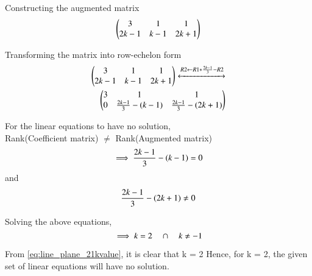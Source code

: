 Constructing the augmented matrix \\

$$
\begin{pmatrix}
    3 & 1 & 1 \\ 
    2\emph{k}-1 & \emph{k}-1 & 2\emph{k}+1
\end{pmatrix}
$$

Transforming the matrix into row-echelon form \\
\begin{align}
\begin{pmatrix}
3 & 1 & 1 \\
2\emph{k}-1 & \emph{k}-1 & 2\emph{k}+1
\end{pmatrix}
  \xleftrightarrow[]{R2 \leftarrow R1*\frac{2\emph{k}-1}{3} - R2 } \nonumber \\
\begin{pmatrix}
3 & 1 & 1 \\
0 & \frac{2\emph{k}-1}{3}-(\emph{k}-1) & \frac{2\emph{k}-1}{3}-(2\emph{k}+1)
\end{pmatrix}
\end{align}

For the linear equations to have no solution, \\
Rank(Coefficient matrix) $\neq$ Rank(Augmented matrix) \\

\begin{equation}
    \implies \frac{2\emph{k}-1}{3}-(\emph{k}-1) = 0 
\end{equation}
and
\begin{equation}
    \frac{2\emph{k}-1}{3}-(2\emph{k}+1) \neq 0 
\end{equation}

Solving the above equations, \\ 

\begin{equation} \label{eq:line_plane_21kvalue}
\implies \emph{k} = 2 \quad \cap \quad \emph{k} \neq -1 
\end{equation}

From \eqref{eq:line_plane_21kvalue}, it is clear that k = 2 
\newline Hence, for k = 2, the given set of linear equations will have no solution.

